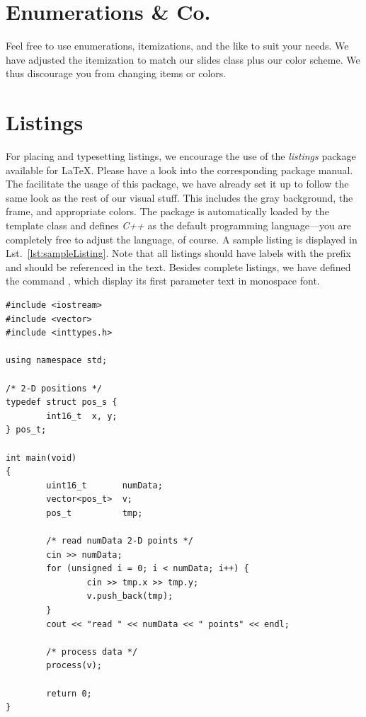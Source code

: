 \section{Enumerations \& Co.}\label{sec:enumerations}

Feel free to use enumerations, itemizations, and the like to suit your needs. We have adjusted the itemization to match our slides class plus our color scheme. We thus discourage you from changing items or colors.



\section{Listings}\label{sec:listings}

For placing and typesetting listings, we encourage the use of the \emph{listings} package available for \LaTeX. Please have a look into the corresponding package manual. The facilitate the usage of this package, we have already set it up to follow the same look as the rest of our visual stuff. This includes the gray background, the frame, and appropriate colors. The package is automatically loaded by the template class and defines \emph{C++} as the default programming language---you are completely free to adjust the language, of course. A sample listing is displayed in Lst.~\ref{lst:sampleListing}. Note that all listings should have labels with the prefix  and should be referenced in the text. Besides complete listings, we have defined the command , which display its first parameter text in monospace font.

\begin{lstlisting}[label=lst:sampleListing,caption={A simple C++ program for reading in positions}]
#include <iostream>                                                                       
#include <vector>                                                                         
#include <inttypes.h>                                                                     

using namespace std;

/* 2-D positions */
typedef struct pos_s {
        int16_t  x, y;
} pos_t;

int main(void)
{
        uint16_t       numData;
        vector<pos_t>  v;
        pos_t          tmp;

        /* read numData 2-D points */
        cin >> numData;
        for (unsigned i = 0; i < numData; i++) {
                cin >> tmp.x >> tmp.y;
                v.push_back(tmp);
        }
        cout << "read " << numData << " points" << endl;

        /* process data */
        process(v);

        return 0;
}
\end{lstlisting}
